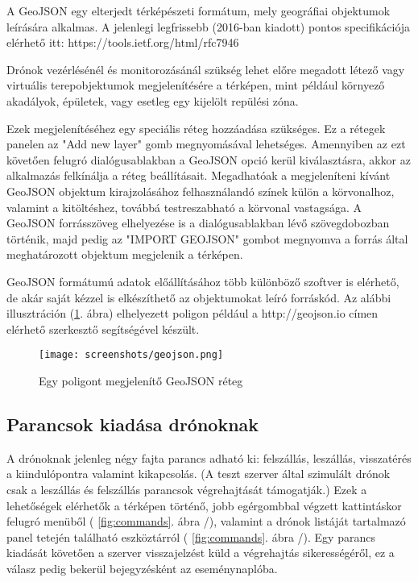 A GeoJSON egy elterjedt térképészeti formátum, mely geográfiai objektumok
leírására alkalmas. A jelenlegi legfrissebb (2016-ban kiadott) pontos
specifikációja elérhető itt: https://tools.ietf.org/html/rfc7946

Drónok vezérlésénél és monitorozásánál szükség lehet előre megadott létező vagy
virtuális terepobjektumok megjelenítésére a térképen, mint például környező
akadályok, épületek, vagy esetleg egy kijelölt repülési zóna.

Ezek megjelenítéséhez egy speciális réteg hozzáadása szükséges. Ez a rétegek
panelen az "Add new layer" gomb megnyomásával lehetséges. Amennyiben az ezt
követően felugró dialógusablakban a GeoJSON opció kerül kiválasztásra, akkor az
alkalmazás felkínálja a réteg beállításait. Megadhatóak a megjeleníteni kívánt
GeoJSON objektum kirajzolásához felhasználandó színek külön a körvonalhoz,
valamint a kitöltéshez, továbbá testreszabható a körvonal vastagsága. A GeoJSON
forrásszöveg elhelyezése is a dialógusablakban lévő szövegdobozban történik,
majd pedig az "IMPORT GEOJSON" gombot megnyomva a forrás által meghatározott
objektum megjelenik a térképen.

GeoJSON formátumú adatok előállításához több különböző szoftver is elérhető, de
akár saját kézzel is elkészíthető az objektumokat leíró forráskód. Az alábbi
illusztráción (\ref{fig:geojson}. ábra) elhelyezett poligon például a
http://geojson.io címen elérhető szerkesztő segítségével készült.

\begin{figure}[H]
  \texttt{[image: screenshots/geojson.png]}
  \caption{Egy poligont megjelenítő GeoJSON réteg}
  \label{fig:geojson}
\end{figure}

\subsection{Parancsok kiadása drónoknak}

A drónoknak jelenleg négy fajta parancs adható ki: felszállás, leszállás,
visszatérés a kiindulópontra valamint kikapcsolás. (A teszt szerver által
szimulált drónok csak a leszállás és felszállás parancsok végrehajtását
támogatják.) Ezek a lehetőségek elérhetők a térképen történő, jobb egérgombbal
végzett kattintáskor felugró menüből ( \ref{fig:commands}. ábra /),
valamint a drónok listáját tartalmazó panel tetején található eszköztárról
( \ref{fig:commands}. ábra /). Egy parancs kiadását követően a
szerver visszajelzést küld a végrehajtás sikerességéről, ez a válasz pedig
bekerül bejegyzésként az eseménynaplóba.

